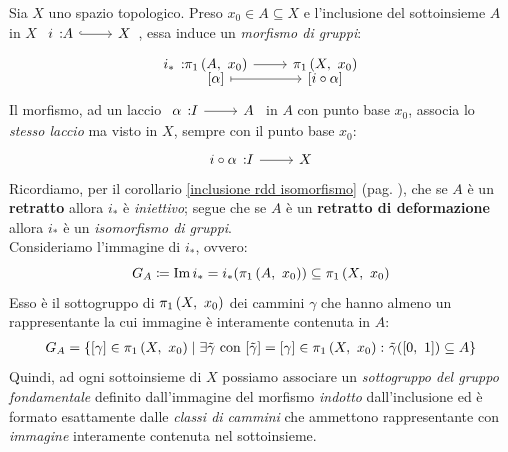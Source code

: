 \begin{observe}\label{retratti gruppo fondamentale}
	Sia $X$ uno spazio topologico. Preso $x_0\in A\subseteq X$ e l'inclusione del sottoinsieme $A$ in $X$ $\incl i A X$, essa induce un \textit{morfismo di gruppi}:
	\begin{equation*}
		\funztot{i_\ast}{\gruf{A}{x_0}}{\gruf{X}{x_0}}{\left[\alpha\right]}{\left[i\circ\alpha\right]}
	\end{equation*}
	Il morfismo, ad un laccio $\funz{\alpha}{I}{A}$ in $A$ con punto base $x_0$, associa lo \textit{stesso laccio} ma visto in $X$, sempre con il punto base $x_0$:
	\begin{equation*}
		\funz{i\circ\alpha}{I}{X}
	\end{equation*}
Ricordiamo, per il corollario \ref{inclusione rdd isomorfismo} (pag. \pageref{inclusione rdd isomorfismo}), che se $A$ è un \textbf{retratto} allora $i_\ast$ è \textit{iniettivo}; segue che se $A$ è un \textbf{retratto di deformazione} allora $i_\ast$ è un \textit{isomorfismo di gruppi}.\\
	Consideriamo l'immagine di $i_\ast$, ovvero:
	\begin{equation*}
		G_A\coloneqq \im i_\ast=i_\ast(\gruf{A}{x_0})\subseteq \gruf{X}{x_0}
	\end{equation*}
	Esso è il sottogruppo di $\gruf{X}{x_0}$ dei cammini $\gamma$ che hanno almeno un rappresentante la cui immagine è interamente contenuta in $A$:
		\begin{gather*}
			G_A=\left\{ [\gamma] \in \gruf{X}{x_0} \mid \exists \tilde{\gamma} \text{ con } [\tilde{\gamma}] =[\gamma]\in \gruf{X}{x_0} \colon \tilde{\gamma}(\intv)\subseteq A \right\}
		\end{gather*}
	Quindi, ad ogni sottoinsieme di $X$ possiamo associare un \textit{sottogruppo del gruppo fondamentale} definito dall'immagine del morfismo \textit{indotto} dall'inclusione ed è formato esattamente dalle \textit{classi di cammini} che ammettono rappresentante con \textit{immagine} interamente contenuta nel sottoinsieme.
\end{observe}

